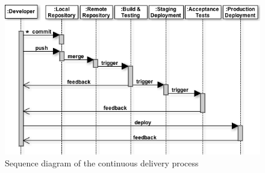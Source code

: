 \begin{figure}[!h]
\center
\includegraphics[keepaspectratio, width=15cm]{sequence-diagrams/cd-process.png}
\caption{Sequence diagram of the continuous delivery process}
\label{cd-process}
\end{figure}